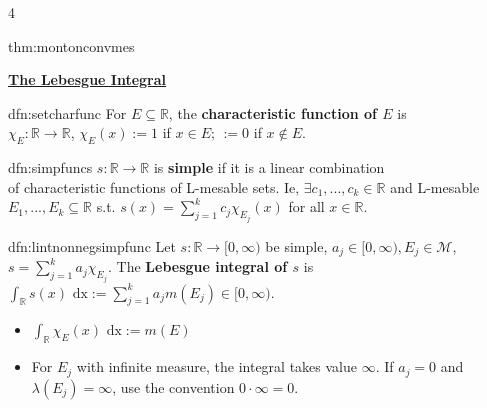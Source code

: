 \documentclass[landscape, 8pt]{extarticle}
\begin{document}
\begin{multicols*}{4}
\begin{thm}{thm:montonconvmes}{ }
		\end{thm}
		
		
		
	{\tiny\textbf{\underline{The Lebesgue Integral}}}
		
		
		
		\begin{dfn}{dfn:setcharfunc}{ }
			For $E \subseteq \mathbb{R}$, the \textbf{characteristic function of $E$} is \\
			$\chi_E: \mathbb{R}\to \mathbb{R}$, $\chi_E(x) := 1$ if $x\in E$; $:= 0$ if $x \notin E$.
			
		\end{dfn}
		
		
		\begin{dfn}{dfn:simpfuncs}{ }
			$s: \mathbb{R} \to \mathbb{R}$ is \textbf{simple} if it is a linear combination \\
			of characteristic functions of L-mesable sets. Ie, $\exists c_1, ..., c_k\in \mathbb{R}$ and L-mesable $E_1, ..., E_k \subseteq \mathbb{R}$ s.t. $s(x) = \sum_{j=1}^{k}c_j \chi_{E_j}(x)$ for all $x\in \mathbb{R}$.
			
		\end{dfn}
		
		
		\begin{dfn}{dfn:lintnonnegsimpfunc}{ }
			Let $s: \mathbb{R} \to [0, \infty)$ be simple, $a_j\in [0, \infty), E_j\in \mathcal{M}$, $s = \sum_{j=1}^{k}a_j \chi_{E_j}$. The \textbf{Lebesgue integral of $s$} is $\int_\mathbb{R} s(x) \text{ dx} := \sum_{j=1}^{k}a_j m(E_j)\in [0, \infty)$.
			\begin{itemize}
				\item $\int_\mathbb{R} \chi_E(x) \text{ dx} := m(E)$
				\vspace{1pt}
				\item For $E_j$ with infinite measure, the integral takes value $\infty$. If $a_j = 0$ and $\lambda(E_j) = \infty$, use the convention $0 \cdot \infty = 0$.
			\end{itemize}
			
		\end{dfn}
		

\end{multicols*}
\end{document}
